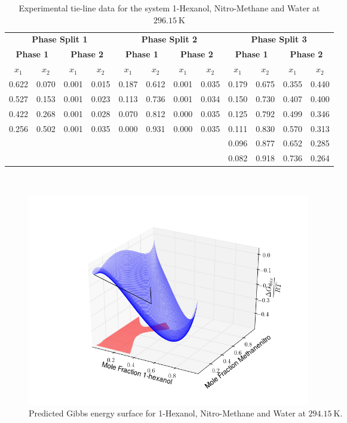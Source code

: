 \begin{table}[hp]
\caption{Experimental tie-line data for the system 1-Hexanol, Nitro-Methane and Water at $296.15~\mathrm{K}$}
\begin{tabular}{cccccccccccc}
\toprule
\multicolumn{4}{c}{\textbf{Phase Split 1}} & \multicolumn{4}{c}{\textbf{Phase Split 2}} & \multicolumn{4}{c}{\textbf{Phase Split 3}}\\
\multicolumn{2}{c}{\textbf{Phase 1}} & \multicolumn{2}{c}{\textbf{Phase 2}} &\multicolumn{2}{c}{\textbf{Phase 1}} & \multicolumn{2}{c}{\textbf{Phase 2}} & \multicolumn{2}{c}{\textbf{Phase 1}} & \multicolumn{2}{c}{\textbf{Phase 2}}\\
$x_{1}$& $x_{2}$ &$x_{1}$& $x_{2}$ &$x_{1}$& $x_{2}$ &$x_{1}$& $x_{2}$ &$x_{1}$& $x_{2}$ &$x_{1}$& $x_{2}$ \\
\midrule
0.622 & 0.070& 0.001 & 0.015 & 0.187 & 0.612 & 0.001 & 0.035& 0.179 & 0.675 & 0.355 & 0.440\\
0.527 & 0.153& 0.001 & 0.023 & 0.113 & 0.736 & 0.001 & 0.034& 0.150 & 0.730 & 0.407 & 0.400\\
0.422 & 0.268& 0.001 & 0.028 & 0.070 & 0.812 & 0.000 & 0.035& 0.125 & 0.792 & 0.499 & 0.346\\
0.256 & 0.502& 0.001 & 0.035 & 0.000 & 0.931 & 0.000 & 0.035& 0.111 & 0.830 & 0.570 & 0.313\\
 & & & & & & & & 0.096 & 0.877 & 0.652 & 0.285\\
 & & & & & & & & 0.082 & 0.918 & 0.736 & 0.264\\
\bottomrule
\end{tabular}\\
\label{TielineData1-hexanol-methanenitro-water2}
\end{table}

\begin{figure}[hp]
\centering
\includegraphics[width = 0.6\textwidth, bb=100 0 500 400]{Results_Parts/TernaryParams/1-hexanol-methanenitro-water/DWPM/294.15/PredictedGibbsWireframe.png}
\caption{Predicted Gibbs energy surface for 1-Hexanol, Nitro-Methane and Water at $294.15~\mathrm{K}$.}
\label{1-hexanol-methanenitro-waterGibbsSurface1}
\end{figure}	

